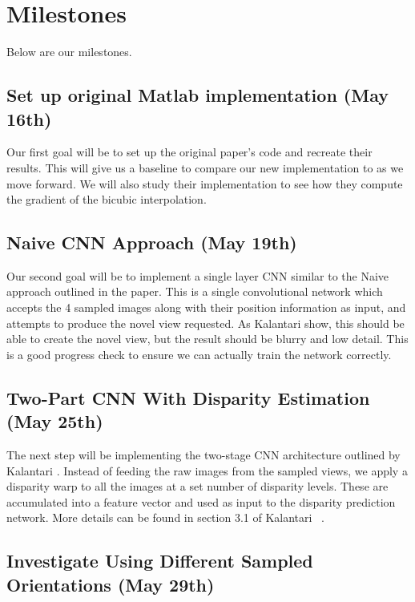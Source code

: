 \documentclass[10pt,twocolumn,letterpaper]{article}
\begin{document}
\section{Milestones}

Below are our milestones.

\subsection{Set up original Matlab implementation (May 16th)}

Our first goal will be to set up the original paper's code and recreate their results. This will
give us a baseline to compare our new implementation to as we move forward. We will also study
their implementation to see how they compute the gradient of the bicubic interpolation.

\subsection{Naive CNN Approach (May 19th)}

Our second goal will be to implement a single layer CNN similar to the
Naive approach outlined in the paper. This is a single convolutional network which
accepts the 4 sampled images along with their position information as input, and
attempts to produce the novel view requested. As Kalantari \etal show, this should be able
to create the novel view, but the result should be blurry and low detail. This is a good
progress check to ensure we can actually train the network correctly.

\subsection{Two-Part CNN With Disparity Estimation (May 25th)}

The next step will be implementing the two-stage CNN architecture outlined by Kalantari \etal.
Instead of feeding the raw images from the sampled views, we apply a disparity warp to all the
images at a set number of disparity levels. These are accumulated into a feature vector and used as
input to the disparity prediction network. More details can be found in section 3.1 of 
Kalantari \etal~\cite{LearningViewSynthesis}.

\subsection{Investigate Using Different Sampled Orientations (May 29th)}
\end{document}
